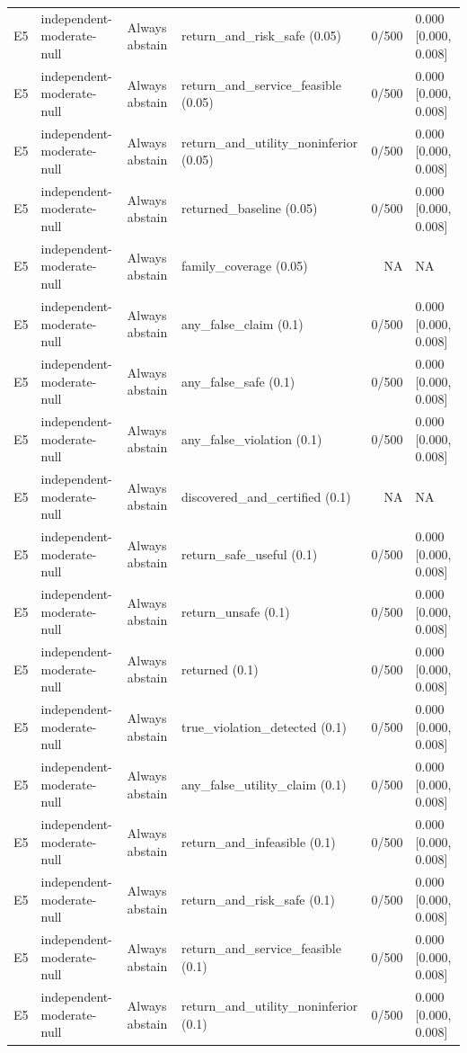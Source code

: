 \begin{longtable}{p{.04\linewidth}p{.18\linewidth}p{.19\linewidth}p{.16\linewidth}r p{.21\linewidth}}
E5 & independent-moderate-null & Always abstain & return\_and\_risk\_safe (0.05) & 0/500 & 0.000 [0.000, 0.008]\\
E5 & independent-moderate-null & Always abstain & return\_and\_service\_feasible (0.05) & 0/500 & 0.000 [0.000, 0.008]\\
E5 & independent-moderate-null & Always abstain & return\_and\_utility\_noninferior (0.05) & 0/500 & 0.000 [0.000, 0.008]\\
E5 & independent-moderate-null & Always abstain & returned\_baseline (0.05) & 0/500 & 0.000 [0.000, 0.008]\\
E5 & independent-moderate-null & Always abstain & family\_coverage (0.05) & NA & NA\\
E5 & independent-moderate-null & Always abstain & any\_false\_claim (0.1) & 0/500 & 0.000 [0.000, 0.008]\\
E5 & independent-moderate-null & Always abstain & any\_false\_safe (0.1) & 0/500 & 0.000 [0.000, 0.008]\\
E5 & independent-moderate-null & Always abstain & any\_false\_violation (0.1) & 0/500 & 0.000 [0.000, 0.008]\\
E5 & independent-moderate-null & Always abstain & discovered\_and\_certified (0.1) & NA & NA\\
E5 & independent-moderate-null & Always abstain & return\_safe\_useful (0.1) & 0/500 & 0.000 [0.000, 0.008]\\
E5 & independent-moderate-null & Always abstain & return\_unsafe (0.1) & 0/500 & 0.000 [0.000, 0.008]\\
E5 & independent-moderate-null & Always abstain & returned (0.1) & 0/500 & 0.000 [0.000, 0.008]\\
E5 & independent-moderate-null & Always abstain & true\_violation\_detected (0.1) & 0/500 & 0.000 [0.000, 0.008]\\
E5 & independent-moderate-null & Always abstain & any\_false\_utility\_claim (0.1) & 0/500 & 0.000 [0.000, 0.008]\\
E5 & independent-moderate-null & Always abstain & return\_and\_infeasible (0.1) & 0/500 & 0.000 [0.000, 0.008]\\
E5 & independent-moderate-null & Always abstain & return\_and\_risk\_safe (0.1) & 0/500 & 0.000 [0.000, 0.008]\\
E5 & independent-moderate-null & Always abstain & return\_and\_service\_feasible (0.1) & 0/500 & 0.000 [0.000, 0.008]\\
E5 & independent-moderate-null & Always abstain & return\_and\_utility\_noninferior (0.1) & 0/500 & 0.000 [0.000, 0.008]\\

\end{longtable}

